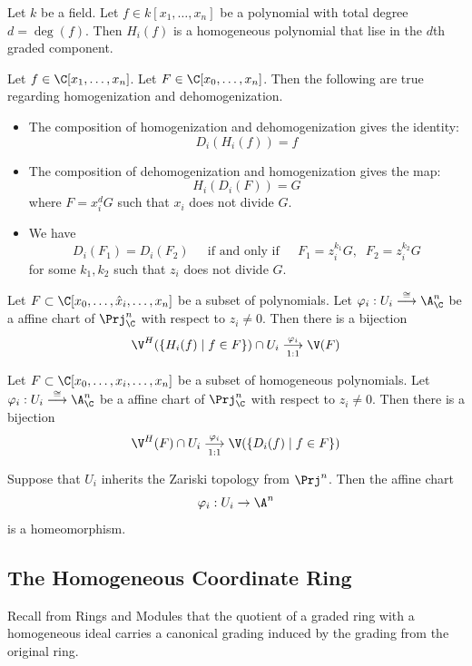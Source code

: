 \documentclass[a4paper]{article}
\begin{document}
\begin{lmm}{}{} Let $k$ be a field. Let $f\in k[x_1,\dots,x_n]$ be a polynomial with total degree $d=\deg(f)$. Then $H_i(f)$ is a homogeneous polynomial that lise in the $d$th graded component. 
\end{lmm}

\begin{prp}{}{} Let $f\in\C[x_1,\dots,x_n]$. Let $F\in\C[x_0,\dots,x_n]$. Then the following are true regarding homogenization and dehomogenization. 
\begin{itemize}
\item The composition of homogenization and dehomogenization gives the identity: $$D_i(H_i(f))=f$$
\item The composition of dehomogenization and homogenization gives the map: $$H_i(D_i(F))=G$$ where $F=x_i^dG$ such that $x_i$ does not divide $G$. 
\item We have $$D_i(F_1)=D_i(F_2)\;\;\;\;\text{ if and only if }\;\;\;\;F_1=z_i^{k_1}G,\;\;F_2=z_i^{k_2}G$$ for some $k_1,k_2$ such that $z_i$ does not divide $G$. 
\end{itemize}
\end{prp}

\begin{crl}{}{} Let $F\subset\C[x_0,\dots,\hat{x}_i,\dots,x_n]$ be a subset of polynomials. Let $\varphi_i:U_i\overset{\cong}{\longrightarrow}\A_\C^n$ be a affine chart of $\Prj_\C^n$ with respect to $z_i\neq 0$. Then there is a bijection $$\V^H(\{H_i(f)\;|\;f\in F\})\cap U_i\underset{1:1}{\overset{\varphi_i}{\longrightarrow}}\V(F)$$
\end{crl}

\begin{crl}{}{} Let $F\subset\C[x_0,\dots,x_i,\dots,x_n]$ be a subset of homogeneous polynomials. Let $\varphi_i:U_i\overset{\cong}{\longrightarrow}\A_\C^n$ be a affine chart of $\Prj_\C^n$ with respect to $z_i\neq 0$. Then there is a bijection $$\V^H(F)\cap U_i\underset{1:1}{\overset{\varphi_i}{\longrightarrow}}\V(\{D_i(f)\;|\;f\in F\})$$
\end{crl}

\begin{crl}{}{} Suppose that $U_i$ inherits the Zariski topology from $\Prj^n$. Then the affine chart $$\varphi_i:U_i\to\A^n$$ is a homeomorphism. 
\end{crl}

\subsection{The Homogeneous Coordinate Ring}
Recall from Rings and Modules that the quotient of a graded ring with a homogeneous ideal carries a canonical grading induced by the grading from the original ring. 
\end{document}

